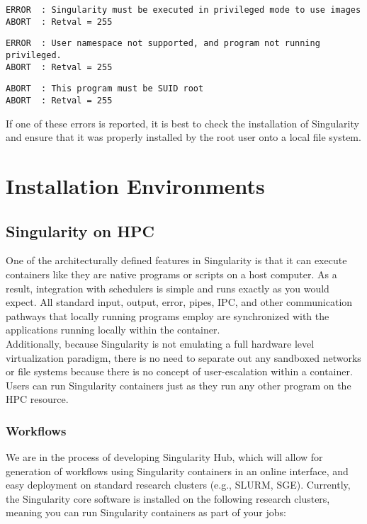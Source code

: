 \documentclass[a4paper]{article}
\begin{document}
\begin{lstlisting}[frame=single]
ERROR  : Singularity must be executed in privileged mode to use images
ABORT  : Retval = 255
\end{lstlisting}
\begin{lstlisting}[frame=single]
ERROR  : User namespace not supported, and program not running privileged.
ABORT  : Retval = 255
\end{lstlisting}
\begin{lstlisting}[frame=single]
ABORT  : This program must be SUID root
ABORT  : Retval = 255
\end{lstlisting}

If one of these errors is reported, it is best to check the installation of Singularity and ensure that it was properly installed by the root user onto a local file system.

\section{Installation Environments}
\subsection{Singularity on HPC}

One of the architecturally defined features in Singularity is that it can execute containers like they are native programs or scripts on a host computer. As a result, integration with schedulers is simple and runs exactly as you would expect. All standard input, output, error, pipes, IPC, and other communication pathways that locally running programs employ are synchronized with the applications running locally within the container.\\[0.1in]

Additionally, because Singularity is not emulating a full hardware level virtualization paradigm, there is no need to separate out any sandboxed networks or file systems because there is no concept of user-escalation within a container. Users can run Singularity containers just as they run any other program on the HPC resource.\\[0.1in]

\subsubsection{Workflows}

We are in the process of developing Singularity Hub, which will allow for generation of workflows using Singularity containers in an online interface, and easy deployment on standard research clusters (e.g., SLURM, SGE). Currently, the Singularity core software is installed on the following research clusters, meaning you can run Singularity containers as part of your jobs:
\end{document}
